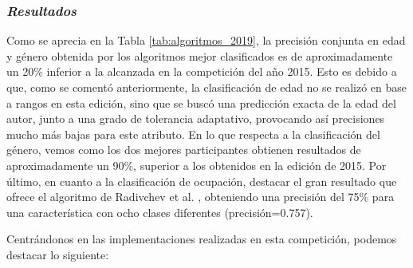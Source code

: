 \subsubsection{\textit{Resultados}}

Como se aprecia en la Tabla \ref{tab:algoritmos_2019}, la precisión conjunta en edad y género obtenida por los algoritmos mejor
clasificados es de aproximadamente un 20\% inferior a la alcanzada en la competición del año 2015. Esto es debido a que,
como se comentó anteriormente, la clasificación de edad no se realizó en base a rangos en esta edición, sino que se
buscó una predicción exacta de la edad del autor, junto a una grado de tolerancia adaptativo, provocando así precisiones mucho
más bajas para este atributo. {\color{red}En lo que respecta a la clasificación del género, vemos como los dos
mejores participantes obtienen resultados de aproximadamente un 90\%, superior a los obtenidos en la edición de 2015.
Por último, en cuanto a la clasificación de ocupación, destacar el gran resultado que ofrece el algoritmo de Radivchev et al. \cite{radivchev2019celebrity},
obteniendo una precisión del 75\% para una característica con ocho clases diferentes (precisión=0.757)}.

\bigskip
Centrándonos en las implementaciones realizadas en esta competición, podemos destacar lo siguiente:

